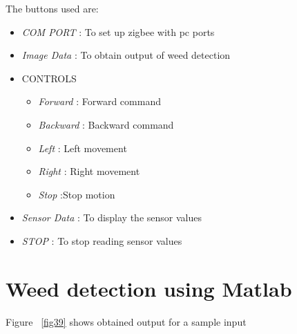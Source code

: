 \documentclass{report}
\begin{document}
The buttons used are:
\begin{itemize}
\item \emph{COM PORT} : To set up zigbee with pc ports
\item \emph{Image Data} : To obtain output of weed detection
\item CONTROLS
\begin{itemize}
\item \emph{Forward} : Forward command
\item \emph{Backward} : Backward command
\item \emph{Left}	: Left movement
\item \emph{Right}	: Right movement
\item \emph{Stop}	:Stop motion
\end{itemize}
\item \emph{Sensor Data} : To display the sensor values
\item \emph{STOP} : To stop reading sensor values
\end{itemize}
\section{Weed detection using Matlab}
Figure ~\ref{fig39} shows obtained output for a sample input\\
\end{document}
